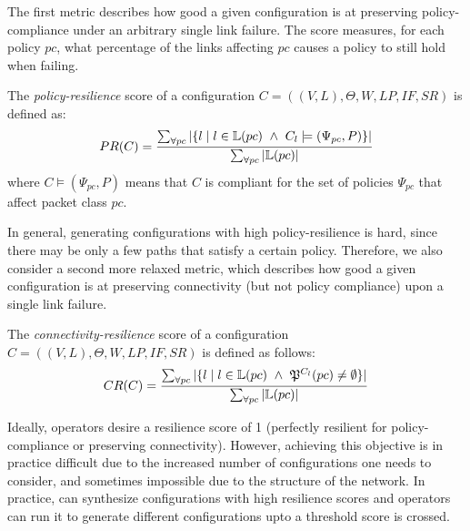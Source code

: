 The first metric describes how good a given configuration
is at preserving policy-compliance under an 
arbitrary single link failure. 
The score measures, for each policy $pc$, what percentage of the links affecting $pc$
causes a policy to still hold when failing.
\begin{definition}
The \emph{policy-resilience} score of a configuration 
$C=((V,L), \Theta,W,LP,IF,SR)$
is defined as:
\[
PR(C)=\frac{\sum_{\forall pc} |\{ l \mid l \in \mathbb{L}(pc) ~\wedge~ C_l \models (\Psi_{pc}, P) \}|}
{\sum_{\forall pc} |\mathbb{L}(pc)|}
\]
where $C \models (\Psi_{pc}, P)$ means that $C$ is 
compliant for the set of policies $\Psi_{pc}$ that affect packet class $pc$.
\end{definition}

In general, generating configurations with high policy-resilience is hard,
since there may be only a few paths that satisfy a certain policy.
Therefore, we also consider a second 
more relaxed metric, which describes how 
good a given configuration
is at preserving connectivity
(but not policy compliance) upon a single link failure. 
\begin{definition}
The \emph{connectivity-resilience} 
score of a configuration $C=((V,L), \Theta,W,LP,IF,SR)$
is defined as follows:
\[
CR(C)=\frac{\sum_{\forall pc} |\{ l \mid l \in \mathbb{L}(pc) ~\wedge~\mathfrak{P}^{C_l }(pc) \not= \emptyset  \}|}
{\sum_{\forall pc} |\mathbb{L}(pc)|}
\]
\end{definition}
 
Ideally, operators desire a resilience score of 1 (perfectly resilient for policy-compliance or
preserving connectivity). However, achieving this objective is in practice difficult  
due to the 
increased number of configurations one needs to consider,
and sometimes impossible due to the structure of the network.
In practice, \name can synthesize configurations 
with high resilience scores and operators can run it to generate different configurations upto 
a threshold score is crossed. 

